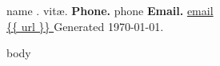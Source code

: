 \documentclass[letter]{article}
\begin{document}
{\huge {{ name }}. vit\ae.} \hfill {\small {\bf Phone.} {{ phone }}
{\bf Email.} \href{mailto: {{ email }} }{ {{email }} }} \\
\url{ {{ url }} } \hfill Generated \today.
\vspace{3mm}

{{ body }}
\end{document}
